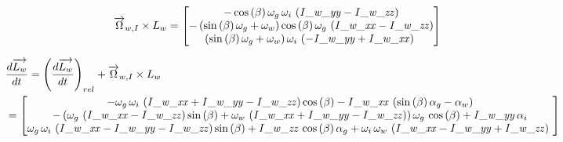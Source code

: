 \begin{equation*}
\begin{split}
\overrightarrow{\Omega}_{w,I}\times L_{w}&=\begin{bmatrix}
-\cos \left( \beta \right) \omega_{g}\,
\omega_{i}\, \left( {\it I\_w\_yy}-{\it I\_w\_zz} \right) 
\\ 
%
- \left( \sin \left( \beta \right) \omega_{g}+
\omega_{w} \right) \cos \left( \beta \right) \omega_{g}\, \left( {\it 
I\_w\_xx}-{\it I\_w\_zz} \right) \\ 
%
 \left( \sin
 \left( \beta \right) \omega_{g}+\omega_{w} \right) \omega_{i}\,
 \left( -{\it I\_w\_yy}+{\it I\_w\_xx} \right) \
\end{bmatrix}
\end{split}
\end{equation*}

\begin{equation*}
\begin{split}
&\frac{d\overrightarrow{L_{w}}}{dt}=\left(\frac{d\overrightarrow{L_{w}}}{dt}\right)_{rel}+\overrightarrow{\Omega}_{w,I}\times L_{w}\\
&=\begin{bmatrix}
-\omega_{g}\,\omega_{i}\, \left( {\it 
I\_w\_xx}+{\it I\_w\_yy}-{\it I\_w\_zz} \right) \cos \left( \beta
 \right) -{\it I\_w\_xx}\, \left( \sin \left( \beta \right) \alpha_{g}
-\alpha_{w} \right) \\ 
%
- \left( \omega_{g}\, \left( 
{\it I\_w\_xx}-{\it I\_w\_zz} \right) \sin \left( \beta \right) +
\omega_{w}\, \left( {\it I\_w\_xx}+{\it I\_w\_yy}-{\it I\_w\_zz}
 \right)  \right) \omega_{g}\,\cos \left( \beta \right) +{\it I\_w\_yy
}\,\alpha_{i}\\ 
%
\omega_{g}\,\omega_{i}\, \left( {
\it I\_w\_xx}-{\it I\_w\_yy}-{\it I\_w\_zz} \right) \sin \left( \beta
 \right) +{\it I\_w\_zz}\,\cos \left( \beta \right) \alpha_{g}+\omega_
{i}\,\omega_{w}\, \left( {\it I\_w\_xx}-{\it I\_w\_yy}+{\it I\_w\_zz}
 \right) \
\end{bmatrix}
\end{split}
\end{equation*}


